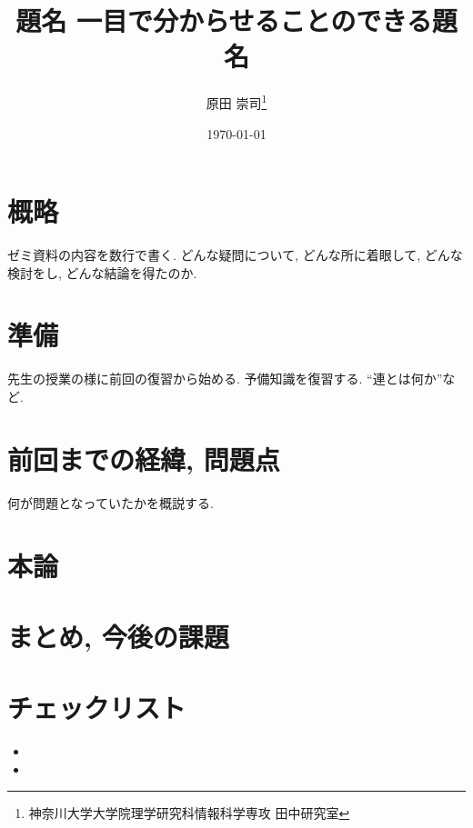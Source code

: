 \documentclass[10pt,twocolumn]{jarticle}
\title{題名 一目で分からせることのできる題名}
\author{原田 崇司\if0\thanks{神奈川大学大学院理学研究科情報科学専攻 田中研究室}\fi}
\date{\today}
\begin{document}
\maketitle
\thispagestyle{empty}

%
%
%
%
%
%

\section{概略}
\noindent ゼミ資料の内容を数行で書く. どんな疑問について, どんな所に着眼して, どんな検討をし, どんな結論を得たのか.

\section{準備}
\noindent 先生の授業の様に前回の復習から始める. 予備知識を復習する. ``連とは何か''など.

\section{前回までの経緯, 問題点}
\noindent 何が問題となっていたかを概説する.

\section{本論}


\section{まとめ, 今後の課題}


\section{チェックリスト}
\begin{itemize}
\item 
\item 
\end{itemize}
\end{document}
